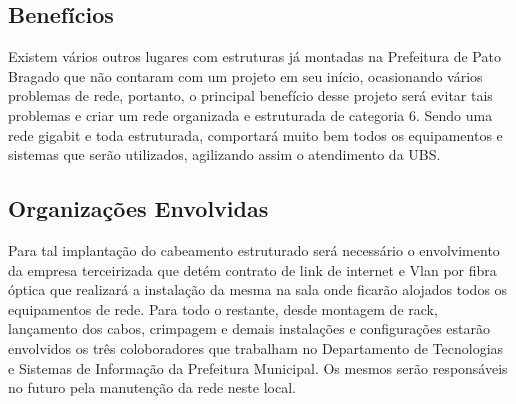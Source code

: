 \documentclass[	DIV=calc,%
							paper=a4,%
							fontsize=12pt,%
							onecolumn]{scrartcl}	 					%
\begin{document}
\subsection{Benefícios}
Existem vários outros lugares com estruturas já montadas na Prefeitura de Pato Bragado que não contaram com um projeto em seu início, ocasionando vários problemas de rede, portanto, o principal benefício desse projeto será evitar tais problemas e criar um rede organizada e estruturada de categoria 6. Sendo uma rede gigabit e toda estruturada, comportará muito bem todos os equipamentos e sistemas que serão utilizados, agilizando assim o atendimento da UBS.

\subsection{Organizações Envolvidas}
Para tal implantação do cabeamento estruturado será necessário o envolvimento da empresa terceirizada que detém contrato de link de internet e Vlan por fibra óptica que realizará a instalação da mesma na sala onde ficarão alojados todos os equipamentos de rede.
Para todo o restante, desde montagem de rack, lançamento dos cabos, crimpagem e demais instalações e configurações estarão envolvidos os três coloboradores que trabalham no Departamento de Tecnologias e Sistemas de Informação da Prefeitura Municipal. Os mesmos serão responsáveis no futuro pela manutenção da rede neste local. 


\end{document}
